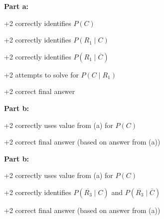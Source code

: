 \documentclass[12pt]{exam}
\begin{document}
\begin{solution}
\textbf{Part a:}
\begin{gwguidelines}
    \item +2 correctly identifies $P(C)$
    \item +2 correctly identifies $P(R_1\mid C)$
    \item +2 correctly identifies $P(R_1\mid \overline{C})$
    \item +2 attempts to solve for $P(C\mid R_1)$
    \item +2 correct final answer
\end{gwguidelines}
\textbf{Part b:}
\begin{gwguidelines}[resume]
    \item +2 correctly uses value from (a) for $P(C)$
    \item +2 correct final answer (based on answer from (a))
\end{gwguidelines}
\textbf{Part b:}
\begin{gwguidelines}[resume]
    \item +2 correctly uses value from (a) for $P(C)$
    \item +2 correctly identifies $P(\overline{R_3}\mid C)$ and $P(\overline{R_3}\mid \overline{C})$
    \item +2 correct final answer (based on answer from (a))
\end{gwguidelines}

\end{solution}
\end{document}
